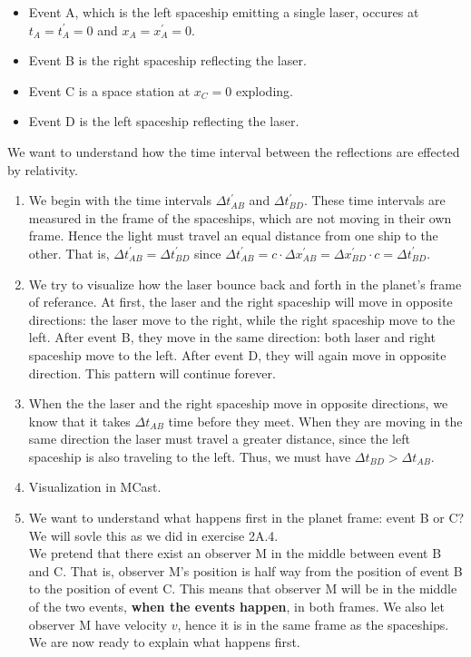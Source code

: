 \documentclass[a4paper,10pt,english]{article}
\begin{document}
\begin{itemize}
\item Event A, which is the left spaceship emitting a single laser, occures at $t_{A}=t_{A}^{\prime}=0$ and $x_{A}=x_{A}^{\prime}=0$.
\item Event B is the right spaceship reflecting the laser.
\item Event C is a space station at $x_{C}=0$ exploding.
\item Event D is the left spaceship reflecting the laser.
\end{itemize}

We want to understand how the time interval between the reflections are effected by relativity.

\begin{enumerate}
\item We begin with the time intervals $\Delta t_{AB}^{\prime}$ and $\Delta t_{BD}^{\prime}$. These time intervals are measured in the frame of the spaceships, which are not moving in their own frame. Hence the light must travel an equal distance from one ship to the other. That is, $\Delta t_{AB}^{\prime}=\Delta t_{BD}^{\prime}$ since $\Delta t_{AB}^{\prime}=c\cdot \Delta x_{AB}^{\prime}=\Delta x_{BD}^{\prime}\cdot c=\Delta t_{BD}^{\prime}$.
\item We try to visualize how the laser bounce back and forth in the planet's frame of referance. At first, the laser and the right spaceship will move in opposite directions: the laser move to the right, while the right spaceship move to the left. After event B, they move in the same direction: both laser and right spaceship move to the left. After event D, they will again move in opposite direction. This pattern will continue forever. 
\item When the the laser and the right spaceship move in opposite directions, we know that it takes $\Delta t_{AB}$ time before they meet. When they are moving in the same direction the laser must travel a greater distance, since the left spaceship is also traveling to the left. Thus, we must have $\Delta t_{BD}>\Delta t_{AB}$.
\item Visualization in MCast.
\item We want to understand what happens first in the planet frame: event B or C? We will sovle this as we did in exercise 2A.4. 
\\
We pretend that there exist an observer M in the middle between event B and C. That is, observer M's position is half way from the position of event B to the position of event C. This means that observer M will be in the middle of the two events, \textbf{when the events happen}, in both frames. We also let observer M have velocity $v$, hence it is in the same frame as the spaceships. We are now ready to explain what happens first.

\end{enumerate}
\end{document}
